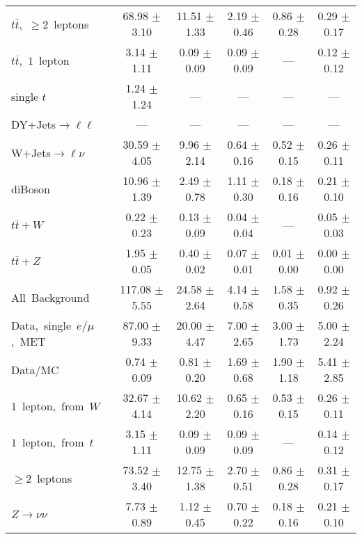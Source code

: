 \documentclass{article}
\begin{document}
\begin{longtable}{|l|c|c|c|c|c|}
$t\bar{t}$,~$\ge2$~leptons & 68.98 $\pm$ 3.10  & 11.51 $\pm$ 1.33  & 2.19 $\pm$ 0.46  & 0.86 $\pm$ 0.28  & 0.29 $\pm$ 0.17 \\* 
$t\bar{t}$,~$1$~lepton & 3.14 $\pm$ 1.11  & 0.09 $\pm$ 0.09  & 0.09 $\pm$ 0.09  & ---  & 0.12 $\pm$ 0.12 \\* 
single $t$  & 1.24 $\pm$ 1.24  & ---  & ---  & ---  & --- \\* 
DY+Jets$\rightarrow\ell\ell$  & ---  & ---  & ---  & ---  & --- \\* 
W+Jets$\rightarrow\ell\nu$  & 30.59 $\pm$ 4.05  & 9.96 $\pm$ 2.14  & 0.64 $\pm$ 0.16  & 0.52 $\pm$ 0.15  & 0.26 $\pm$ 0.11 \\* 
diBoson  & 10.96 $\pm$ 1.39  & 2.49 $\pm$ 0.78  & 1.11 $\pm$ 0.30  & 0.18 $\pm$ 0.16  & 0.21 $\pm$ 0.10 \\* 
$t\bar{t}+W$  & 0.22 $\pm$ 0.23  & 0.13 $\pm$ 0.09  & 0.04 $\pm$ 0.04  & ---  & 0.05 $\pm$ 0.03 \\* 
$t\bar{t}+Z$  & 1.95 $\pm$ 0.05  & 0.40 $\pm$ 0.02  & 0.07 $\pm$ 0.01  & 0.01 $\pm$ 0.00  & 0.00 $\pm$ 0.00 \\* 
\hline \hline 
All~Background  & 117.08 $\pm$ 5.55  & 24.58 $\pm$ 2.64  & 4.14 $\pm$ 0.58  & 1.58 $\pm$ 0.35  & 0.92 $\pm$ 0.26 \\* 
Data,~single~$e/\mu$,~MET  & 87.00 $\pm$ 9.33  & 20.00 $\pm$ 4.47  & 7.00 $\pm$ 2.65  & 3.00 $\pm$ 1.73  & 5.00 $\pm$ 2.24 \\* 
Data/MC  & 0.74 $\pm$ 0.09  & 0.81 $\pm$ 0.20  & 1.69 $\pm$ 0.68  & 1.90 $\pm$ 1.18  & 5.41 $\pm$ 2.85 \\* 
\hline \hline 
$1$~lepton,~from~$W$  & 32.67 $\pm$ 4.14  & 10.62 $\pm$ 2.20  & 0.65 $\pm$ 0.16  & 0.53 $\pm$ 0.15  & 0.26 $\pm$ 0.11 \\* 
$1$~lepton,~from~$t$  & 3.15 $\pm$ 1.11  & 0.09 $\pm$ 0.09  & 0.09 $\pm$ 0.09  & ---  & 0.14 $\pm$ 0.12 \\* 
$\ge2$~leptons  & 73.52 $\pm$ 3.40  & 12.75 $\pm$ 1.38  & 2.70 $\pm$ 0.51  & 0.86 $\pm$ 0.28  & 0.31 $\pm$ 0.17 \\* 
$Z\rightarrow\nu\nu$  & 7.73 $\pm$ 0.89  & 1.12 $\pm$ 0.45  & 0.70 $\pm$ 0.22  & 0.18 $\pm$ 0.16  & 0.21 $\pm$ 0.10 \\* 
\hline 
\end{longtable} 

 
 
 
 
\pagebreak 

 
 
 
 
\end{document}
